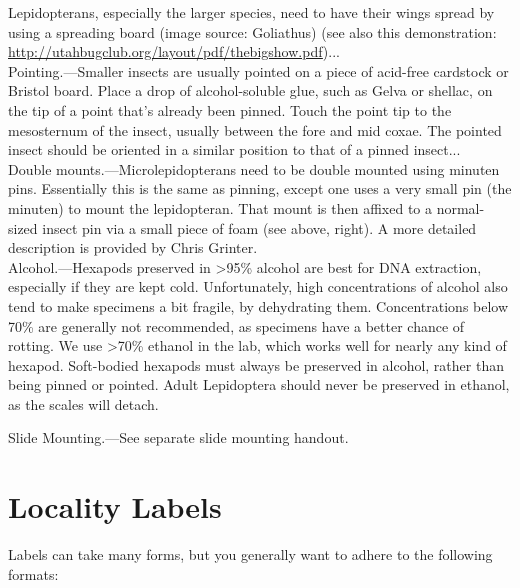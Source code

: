 \documentclass[letterpaper, 11pt]{article}
\begin{document}
Lepidopterans, especially the larger species, need to have their wings spread by using a spreading board (image source: Goliathus) (see also this demonstration: \url{http://utahbugclub.org/layout/pdf/thebigshow.pdf})...\\

Pointing.---Smaller insects are usually pointed on a piece of acid-free cardstock or Bristol board. Place a drop of alcohol-soluble glue, such as Gelva or shellac, on the tip of a point that’s already been pinned. Touch the point tip to the mesosternum of the insect, usually between the fore and mid coxae. The pointed insect should be oriented in a similar position to that of a pinned insect...\\

Double mounts.---Microlepidopterans need to be double mounted using minuten pins. Essentially this is the same as pinning, except one uses a very small pin (the minuten) to mount the lepidopteran. That mount is then affixed to a normal-sized insect pin via a small piece of foam (see above, right). A more detailed description is provided by Chris Grinter.\\

Alcohol.---Hexapods preserved in \textgreater95\% alcohol are best for DNA extraction, especially if they are kept cold. Unfortunately, high concentrations of alcohol also tend to make specimens a bit fragile, by dehydrating them. Concentrations below 70\% are generally not recommended, as specimens have a better chance of rotting. We use \textgreater70\% ethanol in the lab, which works well for nearly any kind of hexapod. Soft-bodied hexapods must always be preserved in alcohol, rather than being pinned or pointed. Adult Lepidoptera should never be preserved in ethanol, as the scales will detach.

Slide Mounting.---See separate slide mounting handout.

\section*{Locality Labels}

Labels can take many forms, but you generally want to adhere to the following formats:
\end{document}
